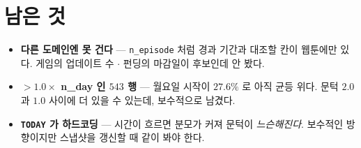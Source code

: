 \documentclass[11pt]{article}
\begin{document}
\section*{남은 것}

\begin{itemize}
\item \textbf{다른 도메인엔 못 건다} --- \texttt{n\_episode} 처럼 경과 기간과
대조할 칸이 웹툰에만 있다. 게임의 업데이트 수 $\cdot$ 펀딩의 마감일이
후보인데 안 봤다.
\item \textbf{$>1.0 \times$ n\_day 인 $543$ 행} --- 월요일 시작이 $27.6\%$ 로
아직 균등 위다. 문턱 $2.0$ 과 $1.0$ 사이에 더 있을 수 있는데, 보수적으로
남겼다.
\item \textbf{\texttt{TODAY} 가 하드코딩} --- 시간이 흐르면 분모가 커져
문턱이 \emph{느슨해진다}. 보수적인 방향이지만 스냅샷을 갱신할 때 같이
봐야 한다.
\end{itemize}
\end{document}
